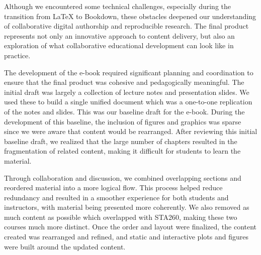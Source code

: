 \documentclass[11pt]{article}
\begin{document}
Although we encountered some technical challenges, especially during the transition from LaTeX to Bookdown, these obstacles deepened our understanding of collaborative digital authorship and reproducible research. The final product represents not only an innovative approach to content delivery, but also an exploration of what collaborative educational development can look like in practice.


The development of the e-book required significant planning and coordination to ensure that the final product was cohesive and pedagogically meaningful. The initial draft was largely a collection of lecture notes and presentation slides. 
We used these to build a single unified document which was a one-to-one replication of the notes and slides.
This was our baseline draft for the e-book.
During the development of this baseline, the inclusion of figures and graphics was sparse since we were aware that content would be rearranged.
After reviewing this initial baseline draft, we realized that the large number of chapters resulted in the fragmentation of related content, making it difficult for students to learn the material.

Through collaboration and discussion, we combined overlapping sections and reordered material into a more logical flow. 
This process helped reduce redundancy and resulted in a smoother experience for both students and instructors, with material being presented more coherently.
We also removed as much content as possible which overlapped with STA260, making these two courses much more distinct.
Once the order and layout were finalized, the content created was rearranged and refined, and static and interactive plots and figures were built around the updated content.
\end{document}

